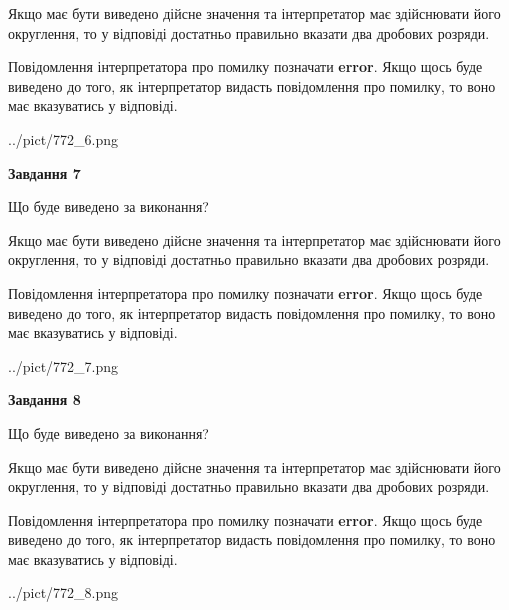 \documentclass[12pt, ukrainian]{article}
\begin{document}
{\begin {Large}
Якщо має бути виведено дійсне значення та інтерпретатор має здійснювати його округлення, 
то у відповіді достатньо правильно вказати два дробових розряди.

Повідомлення інтерпретатора про помилку позначати \textbf{error}.
Якщо щось буде виведено до того, як інтерпретатор видасть повідомлення про помилку, 
то воно має вказуватись у відповіді. \par

\begin{center}
	{../pict/772_6.png}
\end{center}
\newpage

{\begin {center}\textbf{Завдання 7}\end {center}}\par
Що буде виведено за виконання? \par

Якщо має бути виведено дійсне значення та інтерпретатор має здійснювати його округлення, 
то у відповіді достатньо правильно вказати два дробових розряди.

Повідомлення інтерпретатора про помилку позначати \textbf{error}.
Якщо щось буде виведено до того, як інтерпретатор видасть повідомлення про помилку, 
то воно має вказуватись у відповіді. \par

\begin{center}
	{../pict/772_7.png}
\end{center}
\newpage

{\begin {center}\textbf{Завдання 8}\end {center}}\par
Що буде виведено за виконання? \par

Якщо має бути виведено дійсне значення та інтерпретатор має здійснювати його округлення, 
то у відповіді достатньо правильно вказати два дробових розряди.

Повідомлення інтерпретатора про помилку позначати \textbf{error}.
Якщо щось буде виведено до того, як інтерпретатор видасть повідомлення про помилку, 
то воно має вказуватись у відповіді. \par

\begin{center}
	{../pict/772_8.png}
\end{center}
\newpage


\end{Large}}
\end{document}
